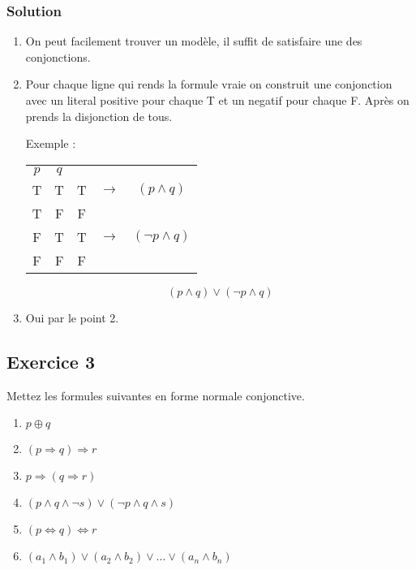 \subsubsection*{Solution}

\begin{enumerate}
	\item On peut facilement trouver un modèle, il suffit de satisfaire une des conjonctions.
	\item Pour chaque ligne qui rends la formule vraie on construit une conjonction avec un literal positive pour chaque T et un negatif pour chaque F. Après on prends la disjonction de tous. 
	
	Exemple :
	

	\begin{tabular}{cc|ccc}
		$p$ & $q$ & &\\
		\cline{1-3}
		T&T&T&$\rightarrow$& $(p \land q)$\\
		T&F&F&&\\
		F&T&T&$\rightarrow$ & $(\neg p \land q)$\\
		F&F&F&&\\
	\end{tabular}
	 
	$$ (p \land q) \lor (\neg p \land q)$$
	\item Oui par le point 2.
\end{enumerate}

\subsection*{Exercice 3}
Mettez les formules suivantes en forme normale conjonctive.
\begin{enumerate}
	\item $ p \oplus q$
	\item $ (p \Rightarrow q) \Rightarrow r  $
	\item $ p \Rightarrow (q \Rightarrow r)  $
	\item $ (p \land q \land \neg s)\lor (\neg p \land q \land s) $
	\item $ (p\Leftrightarrow q) \Leftrightarrow r $ 
	\item $ (a_1 \land b_1 ) \lor (a_2 \land b_2 ) \lor ... \lor (a_n \land b_n )  $
	
\end{enumerate}

